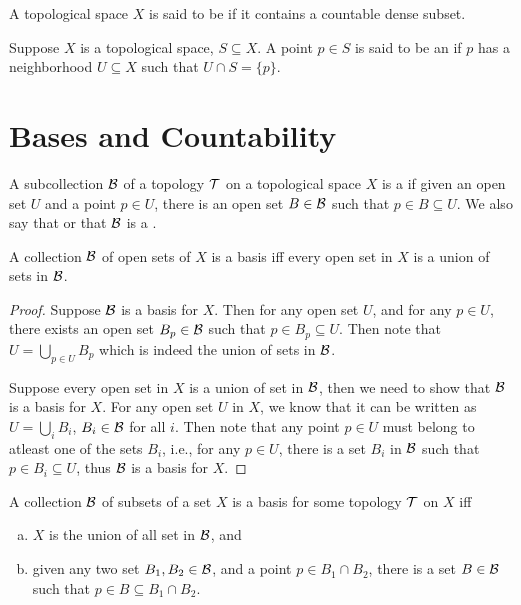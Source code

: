 \documentclass[11pt,a4paper]{article}
\begin{document}
\begin{mydef}
A topological space $X$ is said to be  if it contains a countable dense subset.
\end{mydef}

\begin{mydef}
Suppose $X$ is a topological space, $S\subseteq X$. A point $p\in S$ is said to be an  if $p$ has a neighborhood $U\subseteq X$ such that $U\cap S = \{p\}$.
\end{mydef}

\section{Bases and Countability}

\begin{mydef}
A subcollection $\mathcal{B}$ of a topology $\mathcal{T}$ on a topological space $X$ is a  if given an open set $U$ and a point $p\in U$, there is an open set $B\in\mathcal{B}$ such that $p\in B\subseteq U$. We also say that  or that $\mathcal{B}$ is a .
\end{mydef}

\begin{prop}\label{prop:basis_union_characterization}
A collection $\mathcal{B}$ of open sets of $X$ is a basis iff every open set in $X$ is a union of sets in $\mathcal{B}$.
\end{prop}

\begin{proof}
\forward Suppose $\mathcal{B}$ is a basis for $X$. Then for any open set $U$, and for any $p\in U$, there exists an open set $B_p\in \mathcal{B}$ such that $p\in B_p\subseteq U$. Then note that $U = \bigcup_{p\in U} B_p$ which is indeed the union of sets in $\mathcal{B}$.

\converse Suppose every open set in $X$ is a union of set in $\mathcal{B}$, then we need to show that $\mathcal{B}$ is a basis for $X$. For any open set $U$ in $X$, we know that it can be written as $U = \bigcup_{i} B_i$, $B_i\in \mathcal{B}$ for all $i$. Then note that any point $p\in U$ must belong to atleast one of the sets $B_i$, i.e., for any $p\in U$, there is a set $B_i$ in $\mathcal{B}$ such that $p\in B_i\subseteq U$, thus $\mathcal{B}$ is a basis for $X$. 
\end{proof}

\begin{prop}\label{prop:basis_equivalence}
A collection $\mathcal{B}$ of subsets of a set $X$ is a basis for some topology $\mathcal{T}$ on $X$ iff
\begin{enumerate}[(a)]
    \item $X$ is the union of all set in $\mathcal{B}$, and
    \item given any two set $B_1, B_2\in \mathcal{B}$, and a point $p\in B_1\cap B_2$, there is a set $B\in \mathcal{B}$ such that $p\in B\subseteq B_1\cap B_2$.
\end{enumerate}
\end{prop}
\end{document}
